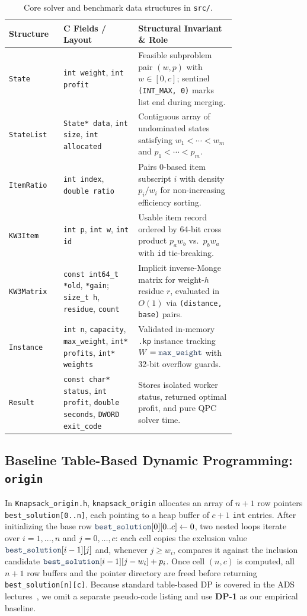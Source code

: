 \documentclass[10pt, a4paper]{article}
\newcommand{\code}[1]{\texttt{\color{primary!90!black}#1}}
\begin{document}
\begin{table}[H]
\centering
\caption{Core solver and benchmark data structures in \code{src/}.}
\label{tab:structures}
\begin{tabular}{@{}l>{\raggedright\arraybackslash}p{0.33\linewidth}>{\raggedright\arraybackslash}p{0.43\linewidth}@{}}
\toprule
\textbf{\color{primary}Structure} & \textbf{\color{primary}C Fields / Layout} & \textbf{\color{primary}Structural Invariant \& Role} \\
\midrule
\code{State} & \code{int weight}, \code{int profit} & Feasible subproblem pair $(w, p)$ with $w \in [0, c]$; sentinel \code{(INT\_MAX, 0)} marks list end during merging. \\
\code{StateList} & \code{State* data}, \code{int size}, \code{int allocated} & Contiguous array of undominated states satisfying $w_1 < \cdots < w_m$ and $p_1 < \cdots < p_m$. \\
\code{ItemRatio} & \code{int index}, \code{double ratio} & Pairs 0-based item subscript $i$ with density $p_i / w_i$ for non-increasing efficiency sorting. \\
\code{KW3Item} & \code{int p}, \code{int w}, \code{int id} & Usable item record ordered by 64-bit cross product $p_a w_b$ vs.\ $p_b w_a$ with \code{id} tie-breaking. \\
\code{KW3Matrix} & \code{const int64\_t *old}, \code{*gain}; \code{size\_t h}, \code{residue}, \code{count} & Implicit inverse-Monge matrix for weight-$h$ residue $r$, evaluated in $O(1)$ via \code{(distance, base)} pairs. \\
\code{Instance} & \code{int n}, \code{capacity}, \code{max\_weight}, \code{int* profits}, \code{int* weights} & Validated in-memory \code{.kp} instance tracking $W = \code{max\_weight}$ with 32-bit overflow guards. \\
\code{Result} & \code{const char* status}, \code{int profit}, \code{double seconds}, \code{DWORD exit\_code} & Stores isolated worker status, returned optimal profit, and pure QPC solver time. \\
\bottomrule
\end{tabular}
\end{table}

\subsection{Baseline Table-Based Dynamic Programming: \texttt{origin}}
In \code{Knapsack\_origin.h}, \code{knapsack\_origin} allocates an array of $n + 1$ row pointers \code{best\_solution[0..n]}, each pointing to a heap buffer of $c + 1$ \code{int} entries. After initializing the base row $\code{best\_solution}[0][0..c] \gets 0$, two nested loops iterate over $i = 1, \ldots, n$ and $j = 0, \ldots, c$: each cell copies the exclusion value $\code{best\_solution}[i-1][j]$ and, whenever $j \ge w_i$, compares it against the inclusion candidate $\code{best\_solution}[i-1][j - w_i] + p_i$. Once cell $(n, c)$ is computed, all $n + 1$ row buffers and the pointer directory are freed before returning \code{best\_solution[n][c]}. Because standard table-based DP is covered in the ADS lectures~\cite{ads_slides2026}, we omit a separate pseudo-code listing and use \textbf{DP-1} as our empirical baseline.
\end{document}
